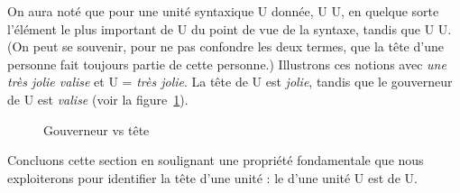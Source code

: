 On aura noté que pour une unité syntaxique U donnée,  U  U, en quelque sorte l’élément le plus important de U du point de vue de la syntaxe, tandis que  U  U. (On peut se souvenir, pour ne pas confondre les deux termes, que la tête d’une personne fait toujours partie de cette personne.) Illustrons ces notions avec \textit{une très jolie valise} et U = \textit{très jolie}. La tête de U est \textit{jolie}, tandis que le gouverneur de U est \textit{valise} (voir la figure~\ref{fig:3.3-tete}).

\begin{figure}
  \caption{Gouverneur vs tête\label{fig:3.3-tete}}
\end{figure}

Concluons cette section en soulignant une propriété fondamentale que nous exploiterons pour identifier la tête d’une unité : le  d’une unité U est  de U.

